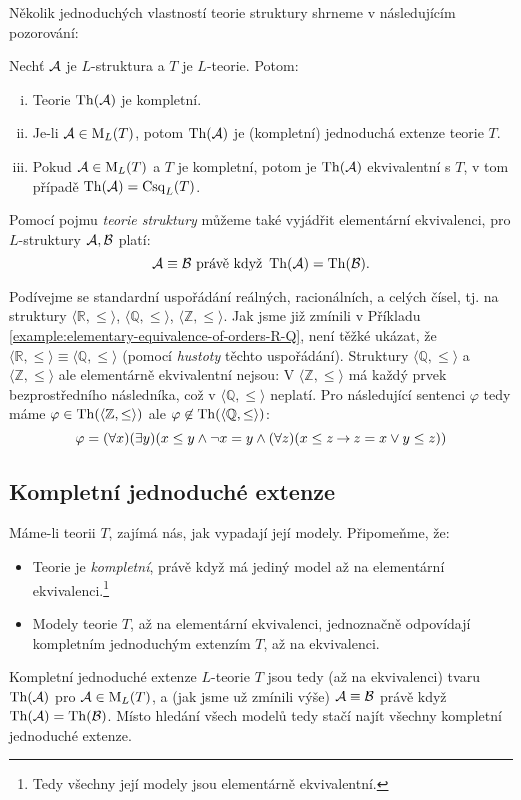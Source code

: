 Několik jednoduchých vlastností teorie struktury shrneme v následujícím pozorování:

\begin{observation}
    Nechť $\mathcal{A}$ je $L$-struktura a $T$ je $L$-teorie. Potom:
    \begin{enumerate}[(i)]
        \item Teorie $\operatorname{Th}(\mathcal{A})$ je kompletní.
        \item Je-li $\mathcal{A}\in\operatorname{M}_L(T)$, potom $\operatorname{Th}(\mathcal{A})$ je (kompletní) jednoduchá extenze teorie $T$.
        \item Pokud $\mathcal{A}\in\operatorname{M}_L(T)$ a $T$ je kompletní, potom je $\operatorname{Th}(\mathcal{A})$ ekvivalentní s $T$, v tom případě $\operatorname{Th}(\mathcal{A})=\operatorname{Csq}_L(T)$.
    \end{enumerate}
\end{observation}

Pomocí pojmu \emph{teorie struktury} můžeme také vyjádřit elementární ekvivalenci, pro $L$-struktury $\mathcal{A},\mathcal{B}$ platí:
$$
\mathcal{A}\equiv\mathcal{B} \text{ právě když }\operatorname{Th}(\mathcal{A})=\operatorname{Th}(\mathcal{B}).
$$

\begin{example}
   Podívejme se standardní uspořádání reálných, racionálních, a celých čísel, tj. na struktury $\langle\mathbb R,\leq\rangle$, $\langle\mathbb Q,\leq\rangle$, $\langle\mathbb Z,\leq\rangle$. Jak jsme již zmínili v Příkladu \ref{example:elementary-equivalence-of-orders-R-Q}, není těžké ukázat, že $\langle\mathbb R,\leq\rangle\equiv\langle\mathbb Q,\leq\rangle$ (pomocí \emph{hustoty} těchto uspořádání). Struktury $\langle\mathbb Q,\leq\rangle$ a $\langle\mathbb Z,\leq\rangle$ ale elementárně ekvivalentní nejsou: V $\langle\mathbb Z,\leq\rangle$ má každý prvek bezprostředního následníka, což v $\langle\mathbb Q,\leq\rangle$ neplatí. Pro následující sentenci $\varphi$ tedy máme $\varphi\in\operatorname{Th}(\langle\mathbb Z,\leq\rangle)$ ale $\varphi\not\in\operatorname{Th}(\langle\mathbb Q,\leq\rangle)$:
   $$
   \varphi=(\forall x)(\exists y)(x\leq y\land \neg x=y\land(\forall z)(x\leq z\mathbin{\rightarrow} z=x\lor y\leq z))
   $$
\end{example}


\subsection{Kompletní jednoduché extenze}

Máme-li teorii $T$, zajímá nás, jak vypadají její modely. Připomeňme, že:
\begin{itemize}
    \item Teorie je \emph{kompletní}, právě když má jediný model až na elementární ekvivalenci.\footnote{Tedy všechny její modely jsou elementárně ekvivalentní.}
    \item Modely teorie $T$, až na elementární ekvivalenci, jednoznačně odpovídají kompletním jednoduchým extenzím $T$, až na ekvivalenci.
\end{itemize}
Kompletní jednoduché extenze $L$-teorie $T$ jsou tedy (až na ekvivalenci) tvaru $\operatorname{Th}(\mathcal{A})$ pro $\mathcal{A}\in\operatorname{M}_L(T)$, a (jak jsme už zmínili výše) $\mathcal{A}\equiv\mathcal{B}$ právě když $\operatorname{Th}(\mathcal{A})=\operatorname{Th}(\mathcal{B})$. Místo hledání všech modelů tedy stačí najít všechny kompletní jednoduché extenze.

